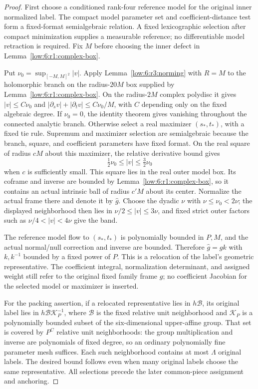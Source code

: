 \documentclass[11pt]{amsart}
\theoremstyle{definition}
\theoremstyle{remark}
\numberwithin{equation}{section}
\begin{document}
\begin{proof}
First choose a conditioned rank-four reference model for the original inner normalized label. The compact model parameter set and coefficient-distance test form a fixed-format semialgebraic relation. A fixed lexicographic selection after compact minimization supplies a measurable reference; no differentiable model retraction is required. Fix $M$ before choosing the inner defect in Lemma~\ref{low:6:r1:complex-box}.

Put $\nu_0=\sup_{[-M,M]^2}|v|$. Apply Lemma~\ref{low:6:r3:norming} with $R=M$ to the holomorphic branch on the radius-$20M$ box supplied by Lemma~\ref{low:6:r1:complex-box}. On the radius-$2M$ complex polydisc it gives $|v|\le C\nu_0$ and $|\partial_sv|+|\partial_tv|\le C\nu_0/M$, with $C$ depending only on the fixed algebraic degree. If $\nu_0=0$, the identity theorem gives vanishing throughout the connected analytic branch. Otherwise select a real maximizer $(s_*,t_*)$, with a fixed tie rule. Supremum and maximizer selection are semialgebraic because the branch, square, and coefficient parameters have fixed format. On the real square of radius $cM$ about this maximizer, the relative derivative bound gives
\[
\tfrac12\nu_0\le |v|\le\tfrac32\nu_0
\]
when $c$ is sufficiently small. This square lies in the real outer model box. Its coframe and inverse are bounded by Lemma~\ref{low:6:r1:complex-box}, so it contains an actual intrinsic ball of radius $c'M$ about its center. Normalize the actual frame there and denote it by $\widehat g$. Choose the dyadic $\nu$ with $\nu\le\nu_0<2\nu$; the displayed neighborhood then lies in $\nu/2\le|v|\le3\nu$, and fixed strict outer factors such as $\nu/4<|v|<4\nu$ give the band.

The reference model flow to $(s_*,t_*)$ is polynomially bounded in $P,M$, and the actual normal/null correction and inverse are bounded. Therefore $\widehat g=gk$ with $k,k^{-1}$ bounded by a fixed power of $P$. This is a relocation of the label's geometric representative. The coefficient integral, normalization determinant, and assigned weight still refer to the original fixed family frame $g$; no coefficient Jacobian for the selected model or maximizer is inserted.

For the packing assertion, if a relocated representative lies in $h\mathcal B$, its original label lies in $h\mathcal B\mathcal K_P^{-1}$, where $\mathcal B$ is the fixed relative unit neighborhood and $\mathcal K_P$ is a polynomially bounded subset of the six-dimensional upper-affine group. That set is covered by $P^C$ relative unit neighborhoods: the group multiplication and inverse are polynomials of fixed degree, so an ordinary polynomially fine parameter mesh suffices. Each such neighborhood contains at most $\Lambda$ original labels. The desired bound follows even when many original labels choose the same representative. All selections precede the later common-piece assignment and anchoring.
\end{proof}
\end{document}
